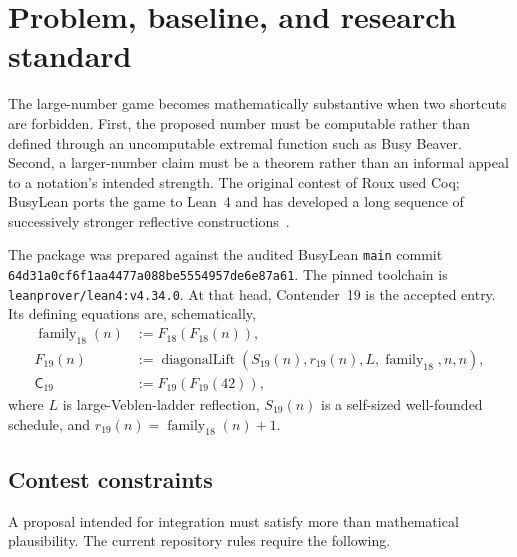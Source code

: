 \documentclass[11pt]{article}
\theoremstyle{definition}
\theoremstyle{remark}
\newcommand{\Cnineteen}{\mathsf{C}_{19}}
\newcommand{\code}[1]{\texttt{#1}}
\begin{document}
\tableofcontents
\newpage

\section{Problem, baseline, and research standard}

The large-number game becomes mathematically substantive when two shortcuts are
forbidden.  First, the proposed number must be computable rather than defined
through an uncomputable extremal function such as Busy Beaver.  Second, a
larger-number claim must be a theorem rather than an informal appeal to a
notation's intended strength.  The original contest of Roux used Coq; BusyLean
ports the game to Lean~4 and has developed a long sequence of successively
stronger reflective constructions~\cite{RouxContest,BusyLeanRepo,Aaronson}.

The package was prepared against the audited BusyLean \code{main} commit
\nolinkurl{64d31a0cf6f1aa4477a088be5554957de6e87a61}.  The pinned toolchain is
\code{leanprover/lean4:v4.34.0}.  At that head, Contender~19 is the accepted
entry.  Its defining equations are, schematically,
\begin{align*}
  \operatorname{family}_{18}(n) &:= F_{18}(F_{18}(n)),\\
  F_{19}(n) &:=
    \operatorname{diagonalLift}(S_{19}(n),r_{19}(n),L,
       \operatorname{family}_{18},n,n),\\
  \Cnineteen &:= F_{19}(F_{19}(42)),
\end{align*}
where $L$ is large-Veblen-ladder reflection, $S_{19}(n)$ is a self-sized
well-founded schedule, and $r_{19}(n)=\operatorname{family}_{18}(n)+1$.

\subsection{Contest constraints}

A proposal intended for integration must satisfy more than mathematical
plausibility.  The current repository rules require the following.
\end{document}

